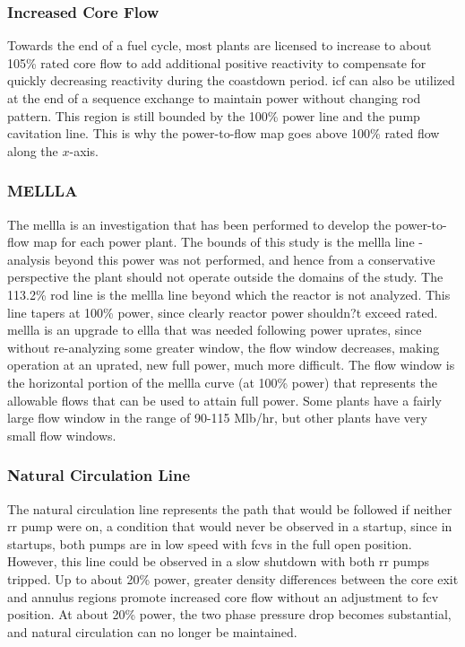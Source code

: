 \documentclass[10pt]{article}
\begin{document}
\subsubsection{Increased Core Flow}
Towards the end of a fuel cycle, most plants are licensed to increase to about 105\% rated core flow to add additional positive reactivity to compensate for quickly decreasing reactivity during the coastdown period. \gls{icf} can also be utilized at the end of a sequence exchange to maintain power without changing rod pattern. This region is still bounded by the 100\% power line and the pump cavitation line. This is why the power-to-flow map goes above 100\% rated flow along the \(x\)-axis.

\subsubsection{MELLLA}
The \gls{mellla} is an investigation that has been performed to develop the power-to-flow map for each power plant. The bounds of this study is the \gls{mellla} line - analysis beyond this power was not performed, and hence from a conservative perspective the plant should not operate outside the domains of the study. The 113.2\% rod line is the \gls{mellla} line beyond which the reactor is not analyzed. This line tapers at 100\% power, since clearly reactor power shouldn?t exceed rated. \gls{mellla} is an upgrade to \gls{ellla} that was needed following power uprates, since without re-analyzing some greater window, the flow window decreases, making operation at an uprated, new full power, much more difficult. The flow window is the horizontal portion of the \gls{mellla} curve (at 100\% power) that represents the allowable flows that can be used to attain full power. Some plants have a fairly large flow window in the range of 90-115 Mlb/hr, but other plants have very small flow windows. 

\subsubsection{Natural Circulation Line}
The natural circulation line represents the path that would be followed if neither \gls{rr} pump were on, a condition that would never be observed in a startup, since in startups, both pumps are in low speed with \gls{fcv}s in the full open position. However, this line could be observed in a slow shutdown with both \gls{rr} pumps tripped. Up to about 20\% power, greater density differences between the core exit and annulus regions promote increased core flow without an adjustment to \gls{fcv} position. At about 20\% power, the two phase pressure drop becomes substantial, and natural circulation can no longer be maintained. 
\end{document}
